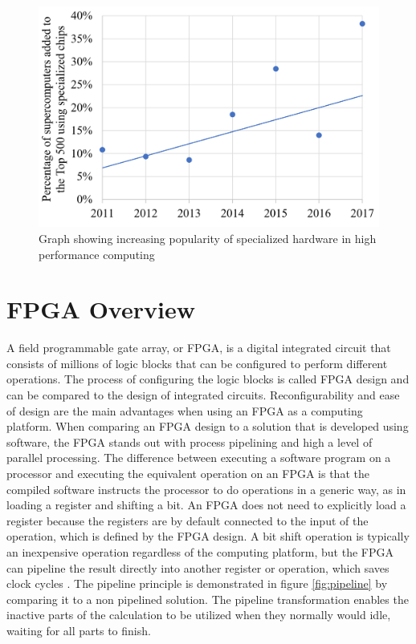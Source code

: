 \documentclass[12pt]{report}
\begin{document}
\begin{figure}
    \centering
    \includegraphics[scale=0.4]{figures/Supercomputers-with-pecialized-chips.png}
    \caption{Graph showing increasing popularity of 
specialized hardware in high performance computing \citep{GenPurpTech}}
    \label{fig:1}
\end{figure}

\section{FPGA Overview}
A field programmable gate array, or FPGA, is a digital integrated circuit that consists of millions of logic blocks that can be configured to perform different operations. The process of configuring the logic blocks is called FPGA design and can be compared to the design of integrated circuits. Reconfigurability and ease of design are the main advantages when using an FPGA as a computing platform. When comparing an FPGA design to a solution that is developed using software, the FPGA stands out with process pipelining and high a level of parallel processing. The difference between executing a software program on a processor and executing the equivalent operation on an FPGA is that the compiled software instructs the processor to do operations in a generic way, as in loading a register and shifting a bit. An FPGA does not need to explicitly load a register because the registers are by default connected to the input of the operation, which is defined by the FPGA design. A bit shift operation is typically an inexpensive operation regardless of the computing platform, but the FPGA can pipeline the result directly into another register or operation, which saves clock cycles \citep{XilFPGAIntro}. The pipeline principle is demonstrated in figure \ref{fig:pipeline} by comparing it to a non pipelined solution. The pipeline transformation enables the inactive parts of the calculation to be utilized when they normally would idle, waiting for all parts to finish.
\end{document}
